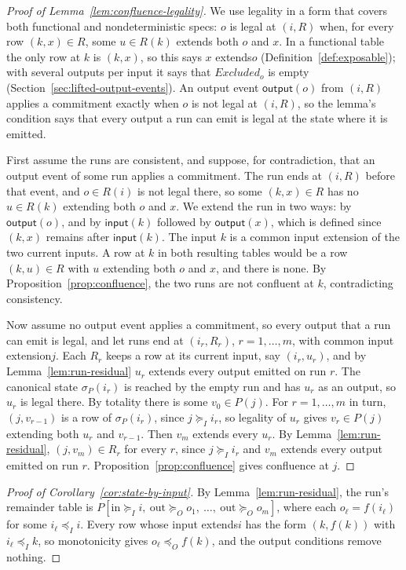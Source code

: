 \documentclass[sigconf]{cidr-2027}
\theoremstyle{remark}
\newcommand{\InputOrd}{\preceq_I}
\newcommand{\OutputOrd}{\preceq_O}
\newcommand{\InputGe}{\succeq_I}
\newcommand{\OutputGe}{\succeq_O}
\newcommand{\commitment}{commitment\xspace}
\newcommand{\inrel}{extends\xspace}          %
\newcommand{\indesc}{input extension\xspace} %
\newcommand{\outrel}{extends\xspace}          %
\newcommand{\outrelpart}{extending\xspace}    %
\newcommand{\Excluded}{\mathit{Excluded}}
\begin{document}
\begin{proof}[Proof of Lemma~\ref{lem:confluence-legality}]
We use legality in a form that covers both functional and nondeterministic
specs: $o$ is legal at $(i,R)$ when, for every row $(k,x)\in R$, some
$u\in R(k)$ \outrel both $o$ and $x$. In a functional table the only row at
$k$ is $(k,x)$, so this says $x$ \outrel $o$
(Definition~\ref{def:exposable}); with several outputs per input it says that
$\Excluded_o$ is empty (Section~\ref{sec:lifted-output-events}). An output
event $\mathsf{output}(o)$ from $(i,R)$ applies a \commitment exactly when $o$
is not legal at $(i,R)$, so the lemma's condition says that every output a run
can emit is legal at the state where it is emitted.

First assume the runs are consistent, and suppose, for contradiction, that an
output event of some run applies a \commitment. The run ends at $(i,R)$
before that event, and $o\in R(i)$ is not legal there, so some $(k,x)\in R$
has no $u\in R(k)$ \outrelpart both $o$ and $x$. We extend the run in two ways: by $\mathsf{output}(o)$, and by
$\mathsf{input}(k)$ followed by $\mathsf{output}(x)$, which is defined since
$(k,x)$ remains after $\mathsf{input}(k)$. The input $k$ is a common \indesc
of the two current inputs. A row at $k$ in both resulting tables would be a
row $(k,u)\in R$ with $u$ \outrelpart both $o$ and $x$, and there is none. By
Proposition~\ref{prop:confluence}, the two runs are not confluent at $k$,
contradicting consistency.

Now assume no output event applies a \commitment, so every output that a run
can emit is legal, and let runs end at $(i_r,R_r)$, $r=1,\ldots,m$, with
common \indesc $j$. Each $R_r$ keeps a
row at its current input, say $(i_r,u_r)$, and by Lemma~\ref{lem:run-residual}
$u_r$ \outrel every output emitted on run $r$. The canonical state
$\sigma_P(i_r)$ is reached by the empty run and has $u_r$ as an output, so $u_r$
is legal there. By totality there is some $v_0\in P(j)$. For $r=1,\ldots,m$
in turn, $(j,v_{r-1})$ is a row of $\sigma_P(i_r)$, since $j\InputGe i_r$, so
legality of $u_r$ gives $v_r\in P(j)$ \outrelpart both $u_r$ and $v_{r-1}$. Then $v_m$ \outrel every $u_r$. By Lemma~\ref{lem:run-residual},
$(j,v_m)\in R_r$ for every $r$, since $j\InputGe i_r$ and $v_m$ \outrel every
output emitted on run $r$. Proposition~\ref{prop:confluence} gives
confluence at $j$.
\end{proof}

\begin{proof}[Proof of Corollary~\ref{cor:state-by-input}]
By Lemma~\ref{lem:run-residual}, the run's remainder table is
$P[\mathrm{in}\InputGe i,\ \mathrm{out}\OutputGe o_1,\ \ldots,\
\mathrm{out}\OutputGe o_m]$, where each $o_\ell=f(i_\ell)$ for some
$i_\ell\InputOrd i$. Every row whose input \inrel $i$ has the form $(k,f(k))$ with
$i_\ell\InputOrd k$, so monotonicity gives $o_\ell\OutputOrd f(k)$, and the
output conditions remove nothing.
\end{proof}
\end{document}
